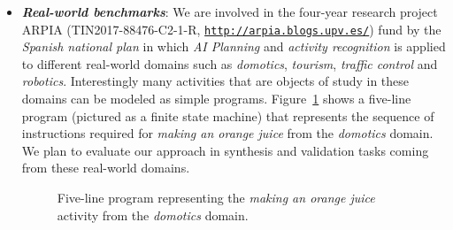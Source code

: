 \documentclass[10pt,a4paper]{paper}
\begin{document}
\begin{itemize}
  
\item {\bf\em Real-world benchmarks}: We are involved in the four-year research project {\sc ARPIA} (TIN2017-88476-C2-1-R, {\tt\small\url{http://arpia.blogs.upv.es/}}) fund by the {\em Spanish national plan} in which {\em AI Planning} and {\em activity recognition} is applied to different real-world domains such as {\em domotics}, {\em tourism}, {\em traffic control} and {\em robotics}. Interestingly many activities that are objects of study in these domains can be modeled as simple programs. Figure~\ref{fig:activity} shows a five-line program (pictured as a finite state machine) that represents the sequence of instructions required for {\em making an orange juice} from the {\em domotics} domain. We plan to evaluate our approach in synthesis and validation tasks coming from these real-world domains. 

\begin{figure}[hbt!]
  \begin{center}
      \begin{scriptsize}   
     \end{scriptsize}            
\end{center}
\caption{\small Five-line program representing the {\em making an orange juice} activity from the {\em domotics} domain.}
\label{fig:activity}
\end{figure}
\end{itemize}
\end{document}
